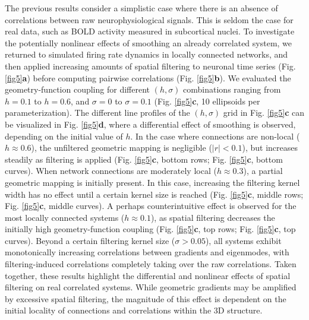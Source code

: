 \documentclass{article}
\begin{document}
The previous results consider a simplistic case where there is an absence of correlations between raw neurophysiological signals. This is seldom the case for real data, such as BOLD activity measured in subcortical nuclei. To investigate the potentially nonlinear effects of smoothing an already correlated system, we returned to simulated firing rate dynamics in locally connected networks, and then applied increasing amounts of spatial filtering to neuronal time series (Fig. \ref{fig5}\textbf{a}) before computing pairwise correlations (Fig. \ref{fig5}\textbf{b}). We evaluated the geometry-function coupling for different $(h, \sigma)$ combinations ranging from $h=0.1$ to $h=0.6$, and $\sigma=0$ to $\sigma=0.1$ (Fig. \ref{fig5}\textbf{c}, 10 ellipsoids per parameterization). The different line profiles of the $(h, \sigma)$ grid in Fig. \ref{fig5}\textbf{c} can be visualized in Fig. \ref{fig5}\textbf{d}, where a differential effect of smoothing is observed, depending on the initial value of $h$. In the case where connections are non-local ($h\approx0.6$), the unfiltered geometric mapping is negligible ($|r|<0.1$), but increases steadily as filtering is applied (Fig. \ref{fig5}\textbf{c}, bottom rows; Fig. \ref{fig5}\textbf{c}, bottom curves). When network connections are moderately local ($h\approx0.3$), a partial geometric mapping is initially present. In this case, increasing the filtering kernel width has no effect until a certain kernel size is reached (Fig. \ref{fig5}\textbf{c}, middle rows; Fig. \ref{fig5}\textbf{c}, middle curves). A perhaps counterintuitive effect is observed for the most locally connected systems ($h\approx0.1$), as spatial filtering decreases the initially high geometry-function coupling (Fig. \ref{fig5}\textbf{c}, top rows; Fig. \ref{fig5}\textbf{c}, top curves). Beyond a certain filtering kernel size ($\sigma>0.05$), all systems exhibit monotonically increasing correlations between gradients and eigenmodes, with filtering-induced correlations completely taking over the raw correlations. Taken together, these results highlight the differential and nonlinear effects of spatial filtering on real correlated systems. While geometric gradients may be amplified by excessive spatial filtering, the magnitude of this effect is dependent on the initial locality of connections and correlations within the 3D structure.
\end{document}
